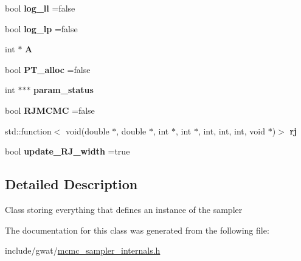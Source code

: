 \begin{DoxyCompactItemize}
\item 
\mbox{\label{classsampler_a3ce309846e66ae741ce34498e3b4c3cd}} 
bool {\bfseries log\+\_\+ll} =false
\item 
\mbox{\label{classsampler_aee1393e2acf14c226cd24ede8c73ce7f}} 
bool {\bfseries log\+\_\+lp} =false
\item 
\mbox{\label{classsampler_acc05de31b897f48f37841d92421dc7ee}} 
int $\ast$ {\bfseries A}
\item 
\mbox{\label{classsampler_afdcb7687d4e6f6d818795b916f2912cf}} 
bool {\bfseries P\+T\+\_\+alloc} =false
\item 
\mbox{\label{classsampler_aa04bac8a01666df1e63f66106978fc0e}} 
int $\ast$$\ast$$\ast$ {\bfseries param\+\_\+status}
\item 
\mbox{\label{classsampler_a7c09c38f1ffd39f3c919d2d261b2e8b2}} 
bool {\bfseries R\+J\+M\+C\+MC} =false
\item 
\mbox{\label{classsampler_ae3db23d73eaaaab8ea75d2ccb0165b7a}} 
std\+::function$<$ void(double $\ast$, double $\ast$, int $\ast$, int $\ast$, int, int, int, void $\ast$)$>$ {\bfseries rj}
\item 
\mbox{\label{classsampler_a687c0eee8242674ec836e6b3986fe1c4}} 
bool {\bfseries update\+\_\+\+R\+J\+\_\+width} =true
\end{DoxyCompactItemize}


\subsection{Detailed Description}
Class storing everything that defines an instance of the sampler 

The documentation for this class was generated from the following file\+:\begin{DoxyCompactItemize}
\item 
include/gwat/\hyperlink{mcmc__sampler__internals_8h}{mcmc\+\_\+sampler\+\_\+internals.\+h}\end{DoxyCompactItemize}
